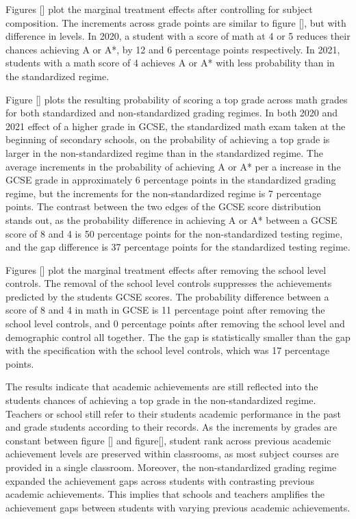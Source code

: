 Figures [] plot the marginal treatment effects after controlling for subject composition. The increments across grade points are similar to figure [], but with difference in levels. In 2020, a student with a score of math at 4 or 5 reduces their chances achieving A or A*, by 12 and 6 percentage points respectively. In 2021, students with a math score of 4 achieves A or A* with less probability than in the standardized regime.

Figure [] plots the resulting probability of scoring a top grade across math grades for both standardized and non-standardized grading regimes. In both 2020 and 2021 effect of a higher grade in GCSE, the standardized math exam taken at the beginning of secondary schools, on the probability of achieving a top grade is larger in the non-standardized regime than in the standardized regime. The average increments in the probability of achieving A or A* per a increase in the GCSE grade in approximately 6 percentage points in the standardized grading regime, but the increments for the non-standardized regime is 7 percentage points. The contrast between the two edges of the GCSE score distribution stands out, as the probability difference in achieving A or A* between a GCSE score of 8 and 4 is 50 percentage points for the non-standardized testing regime, and the gap difference is 37 percentage points for the standardized testing regime.

Figures [] plot the marginal treatment effects after removing the school level controls. The removal of the school level controls suppresses the achievements predicted by the students GCSE scores. The probability difference between a score of 8 and 4 in math in GCSE is 11 percentage point after removing the school level controls, and 0 percentage points after removing the school level and demographic control all together. The the gap is statistically smaller than the gap with the specification with the school level controls, which was 17 percentage points.

The results indicate that academic achievements are still reflected into the students chances of achieving a top grade in the non-standardized regime. Teachers or school still refer to their students academic performance in the past and grade students according to their records. As the increments by grades are constant between figure [] and figure[], student rank across previous academic achievement levels are preserved within classrooms, as most subject courses are provided in a single classroom. Moreover, the non-standardized grading regime expanded the achievement gaps across students with contrasting previous academic achievements. This implies that schools and teachers amplifies the achievement gaps between students with varying previous academic achievements.

